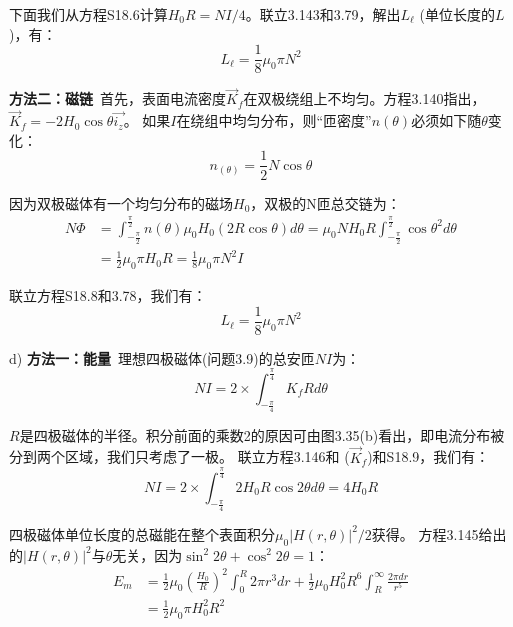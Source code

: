 下面我们从方程S18.6计算$H_0R=NI/4$。联立3.143和3.79，解出$L_\ell$ (单位长度的$L$)，有：
 \begin{equation*}%
L_\ell=\frac{1}{8}\mu_0\pi N^2 \tag{3.87}
\end{equation*}

\textbf{方法二：磁链}\ 首先，表面电流密度$\vec{K}_f$在双极绕组上不均匀。方程3.140指出，$\vec{K}_f=-2H_0\cos\theta\vec{i_z}$。
如果$I$在绕组中均匀分布，则“匝密度”$n(\theta)$必须如下随$\theta$变化：
\begin{equation*}%
n_(\theta)=\frac{1}{2}N\cos\theta \tag{S18.7}
\end{equation*}

因为双极磁体有一个均匀分布的磁场$H_0$，双极的N匝总交链为：
\begin{equation*}%
\begin{split}
N\Phi&=\int_{-\frac{\pi}{2}}^{\frac{\pi}{2}}n(\theta)\mu_0H_0(2R\cos\theta)d\theta=
\mu_0NH_0R\int_{-\frac{\pi}{2}}^{\frac{\pi}{2}}\cos\theta^2d\theta \\
&=\frac{1}{2}\mu_0\pi H_0 R=\frac{1}{8}\mu_0\pi N^2I
\end{split} \tag{S18.8}
\end{equation*}

联立方程S18.8和3.78，我们有：
 \begin{equation*}%
L_\ell=\frac{1}{8}\mu_0\pi N^2 \tag{3.78}
\end{equation*}

d) \textbf{方法一：能量}\ 理想四极磁体(问题3.9)的总安匝$NI$为：
\begin{equation*}%
NI=2\times\int_{-\frac{\pi}{4}}^{\frac{\pi}{4}}K_fRd\theta \tag{S18.9}
\end{equation*}

$R$是四极磁体的半径。积分前面的乘数2的原因可由图3.35(b)看出，即电流分布被分到两个区域，我们只考虑了一极。
联立方程3.146和 ($\vec{K}_f$)和S18.9，我们有：
 \begin{equation*}%
NI=2\times\int_{-\frac{\pi}{4}}^{\frac{\pi}{4}}2H_0R\cos 2\theta d\theta=4H_0R \tag{S18.10}
\end{equation*}

四极磁体单位长度的总磁能在整个表面积分$\mu_0|H(r,\theta)|^2/2$获得。
方程3.145给出的$|H(r,\theta)|^2$与$\theta$无关，因为$\sin^2 2\theta+\cos^2 2\theta=1$：
\begin{equation*}%
\begin{split}
E_m&=\frac{1}{2}\mu_0(\frac{H_0}{R})^2\int_{0}^{R}2\pi r^3dr+\frac{1}{2}\mu_0H_{0}^{2}R^6\int_{R}^{\infty}\frac{2\pi dr}{r^5}\\
&=\frac{1}{2}\mu_0\pi H_{0}^{2}R^2
\end{split}\tag{S18.11}
\end{equation*}

